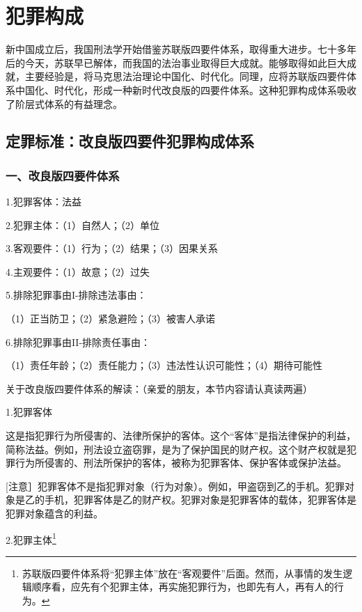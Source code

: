 \chapter{犯罪构成}

\begin{EditionOpeningPanel}
新中国成立后，我国刑法学开始借鉴苏联版四要件体系，取得重大进步。七十多年后的今天，苏联早已解体，而我国的法治事业取得巨大成就。能够取得如此巨大成就，主要经验是，将马克思法治理论中国化、时代化。同理，应将苏联版四要件体系中国化、时代化，形成一种新时代改良版的四要件体系。这种犯罪构成体系吸收了阶层式体系的有益理念。
\end{EditionOpeningPanel}

\section{定罪标准：改良版四要件犯罪构成体系}

\subsection*{一、改良版四要件体系}

1.犯罪客体：法益

2.犯罪主体：（1）自然人；（2）单位

3.客观要件：（1）行为；（2）结果；（3）因果关系

4.主观要件：（1）故意；（2）过失

5.排除犯罪事由I-排除违法事由：

（1）正当防卫；（2）紧急避险；（3）被害人承诺

6.排除犯罪事由II-排除责任事由：

（1）责任年龄；（2）责任能力；（3）违法性认识可能性；（4）期待可能性

关于改良版四要件体系的解读：（亲爱的朋友，本节内容请认真读两遍）

1.犯罪客体

这是指犯罪行为所侵害的、法律所保护的客体。这个“客体”是指法律保护的利益，简称法益。例如，刑法设立盗窃罪，是为了保护国民的财产权。这个财产权就是犯罪行为所侵害的、刑法所保护的客体，被称为犯罪客体、保护客体或保护法益。

[注意］犯罪客体不是指犯罪对象（行为对象）。例如，甲盗窃到乙的手机。犯罪对象是乙的手机，犯罪客体是乙的财产权。犯罪对象是犯罪客体的载体，犯罪客体是犯罪对象蕴含的利益。

2.犯罪主体\footnote{苏联版四要件体系将“犯罪主体”放在“客观要件”后面。然而，从事情的发生逻辑顺序看，应先有个犯罪主体，再实施犯罪行为，也即先有人，再有人的行为。}

